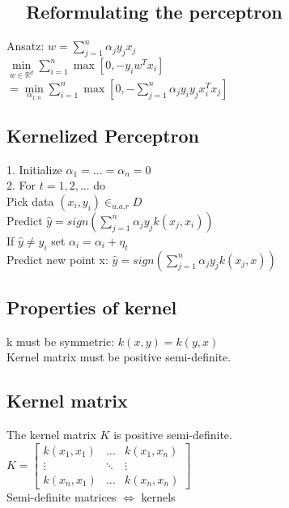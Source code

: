 \subsection*{ ~~Reformulating the perceptron}

Ansatz: $w=\sum_{j=1}^n \alpha_j y_j x_j$\\
$\min \limits_{w\in\mathbb{R}^d} \sum_{i=1}^n \max [0, -y_i w^T x_i]$\\
$= \min \limits_{\alpha_{1:n}} \sum_{i=1}^n \max  [0,- \sum_{j=1}^n \alpha_j y_i y_j x_i^T x_j ]$


\subsection*{Kernelized Perceptron}
1. Initialize $\alpha_1 = ... = \alpha_n = 0$\\
2. For $t = 1, 2, ...$ do \\
Pick data $(x_i,y_i) \in_{u.a.r} D$\\
Predict $\hat{y} = sign(\sum_{j=1}^n \alpha_j y_j k(x_j,x_i))$\\
If $\hat{y} \not = y_i$ set $\alpha_i = \alpha_i + \eta_t$\\
Predict new point x: $\hat{y} = sign(\sum_{j=1}^n \alpha_j y_j k(x_j,x))$

\subsection*{Properties of kernel}
k must be symmetric: $k(x,y) = k(y,x)$\\
Kernel matrix must be positive semi-definite.

\subsection*{Kernel matrix}
The kernel matrix $K$ is positive semi-definite.\\
$K = 
\begin{bmatrix}
	k(x_1,x_1) & \dots & k(x_1,x_n) \\
	\vdots & \ddots & \vdots \\
	k(x_n, x_1) & \dots & k(x_n,x_n)
\end{bmatrix}$\\
Semi-definite matrices $\Leftrightarrow$ kernels

